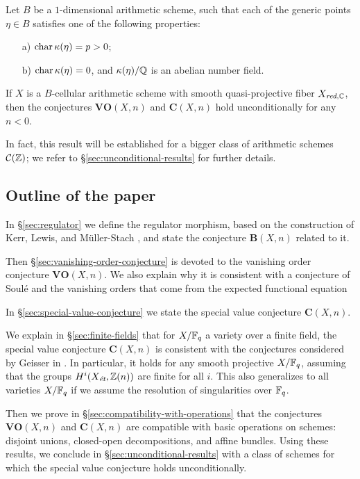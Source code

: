 \documentclass{article}
\numberwithin{equation}{section}
\begin{document}
\begin{maintheorem*}
  Let $B$ be a $1$-dimensional arithmetic scheme, such that each of the generic
  points $\eta \in B$ satisfies one of the following properties:
  \begin{enumerate}
  \item[a)] $\fchar \kappa (\eta) = p > 0$;

  \item[b)] $\fchar \kappa (\eta) = 0$, and $\kappa (\eta)/\QQ$ is an abelian
    number field.
  \end{enumerate}
  If $X$ is a $B$-cellular arithmetic scheme with smooth quasi-projective fiber
  $X_{\red,\CC}$, then the conjectures $\mathbf{VO} (X,n)$ and
  $\mathbf{C} (X,n)$ hold unconditionally for any $n < 0$.
\end{maintheorem*}

In fact, this result will be established for a bigger class of arithmetic
schemes $\mathcal{C} (\ZZ)$; we refer to \S\ref{sec:unconditional-results} for
further details.

\subsection*{Outline of the paper}

In \S\ref{sec:regulator} we define the regulator morphism, based on the
construction of Kerr, Lewis, and Müller-Stach
\cite{Kerr-Lewis-Muller-Stach-2006}, and state the conjecture $\mathbf{B} (X,n)$
related to it.

Then \S\ref{sec:vanishing-order-conjecture} is devoted to the vanishing order
conjecture $\mathbf{VO} (X,n)$. We also explain why it is consistent with a
conjecture of Soulé and the vanishing orders that come from the expected
functional equation

In \S\ref{sec:special-value-conjecture} we state the special value conjecture
$\mathbf{C} (X,n)$.

We explain in \S\ref{sec:finite-fields} that for $X/\FF_q$ a variety over a
finite field, the special value conjecture $\mathbf{C} (X,n)$ is consistent with
the conjectures considered by Geisser in
\cite{Geisser-2004,Geisser-2006,Geisser-2010-arithmetic-homology}.  In
particular, it holds for any smooth projective $X/\FF_q$, assuming that the
groups $H^i (X_\et, \ZZ (n))$ are finite for all $i$. This also generalizes to
all varieties $X/\FF_q$ if we assume the resolution of singularities over
$\FF_q$.

Then we prove in \S\ref{sec:compatibility-with-operations} that the conjectures
$\mathbf{VO} (X,n)$ and $\mathbf{C} (X,n)$ are compatible with basic operations
on schemes: disjoint unions, closed-open decompositions, and affine
bundles. Using these results, we conclude in \S\ref{sec:unconditional-results}
with a class of schemes for which the special value conjecture holds
unconditionally.
\end{document}
